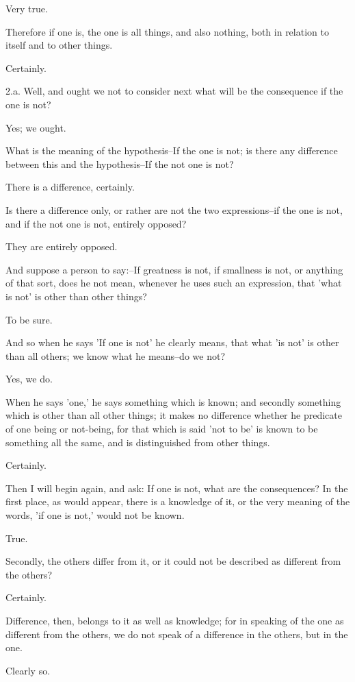Very true.

Therefore if one is, the one is all things, and also nothing, both in
relation to itself and to other things.

Certainly.

2.a. Well, and ought we not to consider next what will be the
consequence if the one is not?

Yes; we ought.

What is the meaning of the hypothesis--If the one is not; is there any
difference between this and the hypothesis--If the not one is not?

There is a difference, certainly.

Is there a difference only, or rather are not the two expressions--if
the one is not, and if the not one is not, entirely opposed?

They are entirely opposed.

And suppose a person to say:--If greatness is not, if smallness is not,
or anything of that sort, does he not mean, whenever he uses such an
expression, that 'what is not' is other than other things?

To be sure.

And so when he says 'If one is not' he clearly means, that what 'is not'
is other than all others; we know what he means--do we not?

Yes, we do.

When he says 'one,' he says something which is known; and secondly
something which is other than all other things; it makes no difference
whether he predicate of one being or not-being, for that which is said
'not to be' is known to be something all the same, and is distinguished
from other things.

Certainly.

Then I will begin again, and ask: If one is not, what are the
consequences? In the first place, as would appear, there is a knowledge
of it, or the very meaning of the words, 'if one is not,' would not be
known.

True.

Secondly, the others differ from it, or it could not be described as
different from the others?

Certainly.

Difference, then, belongs to it as well as knowledge; for in speaking of
the one as different from the others, we do not speak of a difference in
the others, but in the one.

Clearly so.

